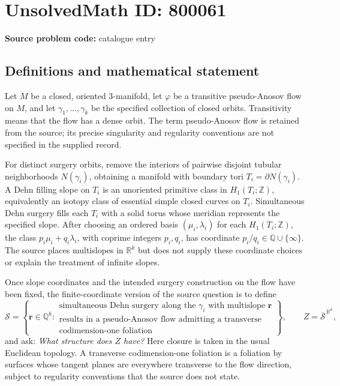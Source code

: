 \documentclass[11pt]{article}
\newcommand{\Z}{\mathbb{Z}}
\newcommand{\Q}{\mathbb{Q}}
\newcommand{\R}{\mathbb{R}}
\begin{document}
\section*{UnsolvedMath ID: 800061}
\textbf{Source problem code:} catalogue entry
\subsection{Definitions and mathematical statement}
Let \(M\) be a closed, oriented \(3\)-manifold, let \(\varphi\) be a transitive pseudo-Anosov flow on \(M\), and let \(\gamma_1,\ldots,\gamma_k\) be the specified collection of closed orbits. Transitivity means that the flow has a dense orbit. The term pseudo-Anosov flow is retained from the source; its precise singularity and regularity conventions are not specified in the supplied record.

For distinct surgery orbits, remove the interiors of pairwise disjoint tubular neighborhoods \(N(\gamma_i)\), obtaining a manifold with boundary tori \(T_i=\partial N(\gamma_i)\). A Dehn filling slope on \(T_i\) is an unoriented primitive class in \(H_1(T_i;\Z)\), equivalently an isotopy class of essential simple closed curves on \(T_i\). Simultaneous Dehn surgery fills each \(T_i\) with a solid torus whose meridian represents the specified slope. After choosing an ordered basis \((\mu_i,\lambda_i)\) for each \(H_1(T_i;\Z)\), the class \(p_i\mu_i+q_i\lambda_i\), with coprime integers \(p_i,q_i\), has coordinate \(p_i/q_i\in\Q\cup\{\infty\}\). The source places multislopes in \(\R^k\) but does not supply these coordinate choices or explain the treatment of infinite slopes.

Once slope coordinates and the intended surgery construction on the flow have been fixed, the finite-coordinate version of the source question is to define
\[
\mathcal S=\left\{\mathbf r\in\Q^k:\begin{array}{l}
\text{simultaneous Dehn surgery along the }\gamma_i\text{ with multislope }\mathbf r\\
\text{results in a pseudo-Anosov flow admitting a transverse}\\
\text{codimension-one foliation}
\end{array}\right\},
\qquad
Z=\overline{\mathcal S}^{\,\R^k},
\]
and ask: \emph{What structure does \(Z\) have?} Here closure is taken in the usual Euclidean topology. A transverse codimension-one foliation is a foliation by surfaces whose tangent planes are everywhere transverse to the flow direction, subject to regularity conventions that the source does not state.
\end{document}
